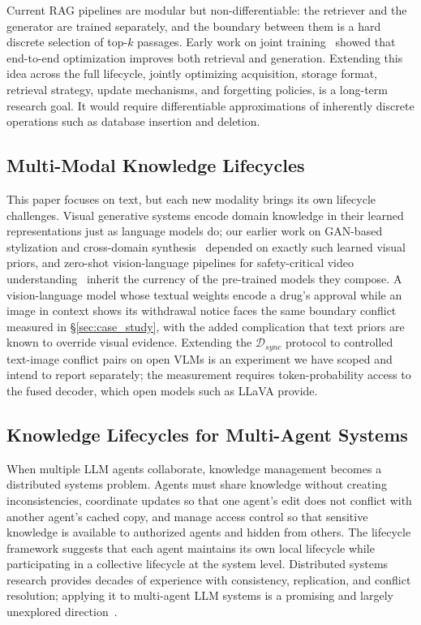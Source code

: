 \documentclass{article}
\begin{document}
Current RAG pipelines are modular but non-differentiable: the retriever and the generator are trained separately, and the boundary between them is a hard discrete selection of top-$k$ passages. Early work on joint training~\citep{guu2020realm, izacard2023atlas} showed that end-to-end optimization improves both retrieval and generation. Extending this idea across the full lifecycle, jointly optimizing acquisition, storage format, retrieval strategy, update mechanisms, and forgetting policies, is a long-term research goal. It would require differentiable approximations of inherently discrete operations such as database insertion and deletion.

\subsection{Multi-Modal Knowledge Lifecycles}

This paper focuses on text, but each new modality brings its own lifecycle challenges. Visual generative systems encode domain knowledge in their learned representations just as language models do; our earlier work on GAN-based stylization and cross-domain synthesis~\citep{thakur2021whitebox, thakur2021aoda} depended on exactly such learned visual priors, and zero-shot vision-language pipelines for safety-critical video understanding~\citep{thakur2026accident} inherit the currency of the pre-trained models they compose. A vision-language model whose textual weights encode a drug's approval while an image in context shows its withdrawal notice faces the same boundary conflict measured in \S\ref{sec:case_study}, with the added complication that text priors are known to override visual evidence. Extending the $\mathcal{D}_{sync}$ protocol to controlled text-image conflict pairs on open VLMs is an experiment we have scoped and intend to report separately; the measurement requires token-probability access to the fused decoder, which open models such as LLaVA provide.

\subsection{Knowledge Lifecycles for Multi-Agent Systems}

When multiple LLM agents collaborate, knowledge management becomes a distributed systems problem. Agents must share knowledge without creating inconsistencies, coordinate updates so that one agent's edit does not conflict with another agent's cached copy, and manage access control so that sensitive knowledge is available to authorized agents and hidden from others. The lifecycle framework suggests that each agent maintains its own local lifecycle while participating in a collective lifecycle at the system level. Distributed systems research provides decades of experience with consistency, replication, and conflict resolution; applying it to multi-agent LLM systems is a promising and largely unexplored direction~\citep{wang2024agents}.
\end{document}
